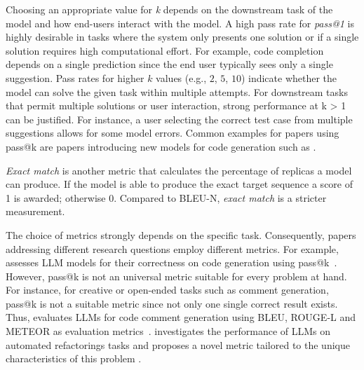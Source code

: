 Choosing an appropriate value for \emph{k} depends on the downstream task of the model and how end-users interact with the model.
A high pass rate for \emph{pass@1} is highly desirable in tasks where the system only presents one solution or if a single solution requires high computational effort.
For example, code completion depends on a single prediction since the end user typically sees only a single suggestion.
Pass rates for higher $k$ values (e.g., $2$, $5$, $10$) indicate whether the model can solve the given task within multiple attempts.
For downstream tasks that permit multiple solutions or user interaction, strong performance at k > 1 can be justified. 
For instance, a user selecting the correct test case from multiple suggestions allows for some model errors.
Common examples for papers using pass@k are papers introducing new models for code generation such as \cite{DBLP:journals/corr/abs-2308-12950, DBLP:journals/corr/abs-2401-14196, DBLP:journals/corr/abs-2409-12186, DBLP:journals/corr/abs-2305-06161}.

\emph{Exact match} is another metric that calculates the percentage of replicas a model can produce.
If the model is able to produce the exact target sequence a score of 1 is awarded; otherwise 0.
Compared to BLEU-N, \emph{exact match} is a stricter measurement.

The choice of metrics strongly depends on the specific task.
Consequently, papers addressing different research questions employ different metrics.
For example, \citeauthor{DBLP:conf/nips/LiuXW023} assesses LLM models for their correctness on code generation using pass@k~\cite{DBLP:conf/nips/LiuXW023}.
However, pass@k is not an universal metric suitable for every problem at hand.
For instance, for creative or open-ended tasks such as comment generation, pass@k is not a suitable metric since not only one single correct result exists.
Thus, \citeauthor{DBLP:conf/icse/GengWD00JML24} evaluates LLMs for code comment generation using BLEU, ROUGE-L and METEOR as evaluation metrics~\cite{DBLP:conf/icse/GengWD00JML24}.
\citeauthor{DBLP:journals/ase/LiuJZNLL25} investigates the performance of LLMs on automated refactorings tasks and proposes a novel metric tailored to the unique characteristics of this problem \cite{DBLP:journals/ase/LiuJZNLL25}.

